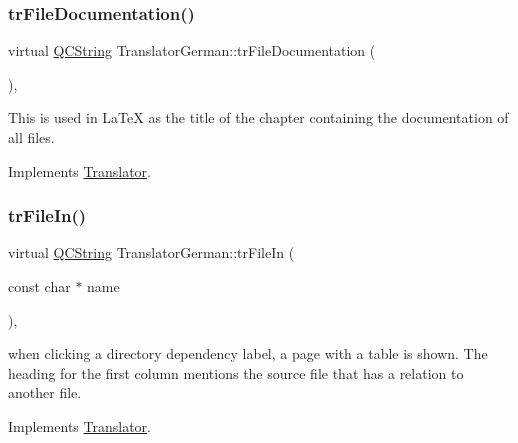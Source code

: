 \mbox{\label{class_translator_german_ad63e5167c4add46fcf30104ee5e1d47f}} 
\subsubsection{\texorpdfstring{trFileDocumentation()}{trFileDocumentation()}}
{\footnotesize\ttfamily virtual \mbox{\hyperlink{class_q_c_string}{Q\+C\+String}} Translator\+German\+::tr\+File\+Documentation (\begin{DoxyParamCaption}{ }\end{DoxyParamCaption})\hspace{0.3cm}{\ttfamily [inline]}, {\ttfamily [virtual]}}

This is used in La\+TeX as the title of the chapter containing the documentation of all files. 

Implements \mbox{\hyperlink{class_translator}{Translator}}.

\mbox{\label{class_translator_german_a398ba2ade80d8a8f9bbef1d91f8406cd}} 
\subsubsection{\texorpdfstring{trFileIn()}{trFileIn()}}
{\footnotesize\ttfamily virtual \mbox{\hyperlink{class_q_c_string}{Q\+C\+String}} Translator\+German\+::tr\+File\+In (\begin{DoxyParamCaption}\item[{const char $\ast$}]{name }\end{DoxyParamCaption})\hspace{0.3cm}{\ttfamily [inline]}, {\ttfamily [virtual]}}

when clicking a directory dependency label, a page with a table is shown. The heading for the first column mentions the source file that has a relation to another file. 

Implements \mbox{\hyperlink{class_translator}{Translator}}.

\mbox{\label{class_translator_german_a4d42936d9f22ccc1ba6cf4786cd09df1}} 
